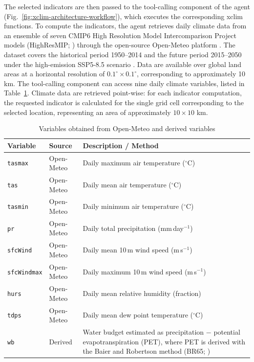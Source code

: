 The selected indicators are then passed to the tool-calling component of the agent (Fig.~\ref{fig:xclim-architecture-workflow}), which executes the corresponding xclim functions. To compute the indicators, the agent retrieves daily climate data from an ensemble of seven CMIP6 High Resolution Model Intercomparison Project models (HighResMIP; \citet{haarsma_high_2016}) through the open-source Open-Meteo platform \citep{zippenfenig_open-meteo_2024}. The dataset covers the historical period 1950--2014 and the future period 2015--2050 under the high-emission SSP5-8.5 scenario \citep{oneill_scenario_2016}. Data are available over global land areas at a horizontal resolution of $0.1^\circ \times 0.1^\circ$, corresponding to approximately 10 km. The tool-calling component can access nine daily climate variables, listed in Table~\ref{tab:variables_openmeteo}. Climate data are retrieved point-wise: for each indicator computation, the requested indicator is calculated for the single grid cell corresponding to the selected location, representing an area of approximately $10 \times 10$ km.

\begin{table}[ht]
    \centering
    \caption{Variables obtained from Open-Meteo and derived variables}
        \begin{tabular}{llp{8.5cm}}
            \toprule
            \textbf{Variable} & \textbf{Source} & \textbf{Description / Method} \\
            \midrule
            \texttt{tasmax} & Open-Meteo & Daily maximum air temperature ($^\circ$C) \\
            \texttt{tas} & Open-Meteo & Daily mean air temperature ($^\circ$C) \\
            \texttt{tasmin} & Open-Meteo & Daily minimum air temperature ($^\circ$C) \\
            \texttt{pr} & Open-Meteo & Daily total precipitation (mm\,day$^{-1}$) \\
            \texttt{sfcWind} & Open-Meteo & Daily mean 10\,m wind speed (m\,s$^{-1}$) \\
            \texttt{sfcWindmax} & Open-Meteo & Daily maximum 10\,m wind speed (m\,s$^{-1}$) \\
            \texttt{hurs} & Open-Meteo & Daily mean relative humidity (fraction) \\
            \texttt{tdps} & Open-Meteo & Daily mean dew point temperature ($^\circ$C) \\
            \midrule
            \texttt{wb} & Derived & Water budget estimated as precipitation $-$ potential evapotranspiration (PET), where PET is derived with the Baier and Robertson method (BR65; \cite{baier_estimation_1965}) \\
            \bottomrule
        \end{tabular}
    \label{tab:variables_openmeteo}
\end{table}


